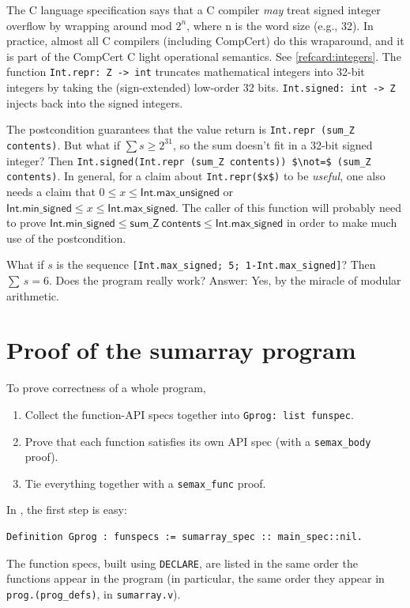 \documentclass[12pt,fleqn,openany,oneside,showtrims]{memoir}
\begin{document}
The C language specification says that a C compiler \emph{may} treat
signed integer overflow by wrapping around mod $2^n$, where n is the
word size (e.g., 32).  In practice, almost all C compilers (including
CompCert) do this wraparound, and it is part of the CompCert
C light operational semantics. See \autoref{refcard:integers}.
The function \lstinline{Int.repr: Z -> int} truncates mathematical
integers into 32-bit integers by taking the (sign-extended) low-order
32 bits.  \lstinline{Int.signed: int -> Z} injects back into the signed
integers.

The postcondition guarantees that the value return is
\lstinline{Int.repr (sum_Z contents)}.  But what if
$\sum s \ge 2^{31}$, so the sum doesn't fit in
a 32-bit signed integer?  Then
\lstinline{Int.signed(Int.repr (sum_Z contents)) $\not=$ (sum_Z contents)}.  In general, for a claim about \lstinline{Int.repr($x$)} to
be \emph{useful}, one also needs
a claim that $0\le x \le \mathsf{Int.max\_unsigned}$
or $\mathsf{Int.min\_signed} \le x \le \mathsf{Int.max\_signed}$.
The caller of this function will probably need
to prove
$\mathsf{Int.min\_signed} \le \mathsf{sum\_Z~contents} \le \mathsf{Int.max\_signed}$
in order to make much use of the postcondition.

What if $s$
  is the sequence \lstinline{[Int.max_signed; 5; 1-Int.max_signed]}?
  Then $\sum\,s=6$.  Does the program really work?  Answer: Yes,
  by the miracle of modular arithmetic.

\chapter{Proof of the \textsf{sumarray} program}
\label{refcard:sumarray-proof}
To prove correctness of a whole program,
\begin{enumerate}
\item Collect the function-API specs together into
  \lstinline{Gprog: list funspec}.
  \item Prove that each function satisfies its own API spec
    (with a \lstinline{semax_body} proof).
  \item Tie everything together with a \lstinline{semax_func} proof.
\end{enumerate}

In , the first step is easy:
\begin{lstlisting}
Definition Gprog : funspecs := sumarray_spec :: main_spec::nil.
\end{lstlisting}
The function specs, built using \lstinline{DECLARE},
are listed in the same order the functions appear in
the program (in particular, the same order they appear
in \lstinline{prog.(prog_defs)}, in \lstinline{sumarray.v}).
\end{document}
